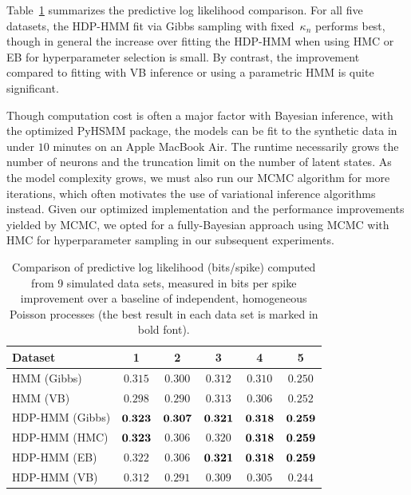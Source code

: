 Table~\ref{tab:synth_pll} summarizes the predictive log likelihood
comparison.  For all five datasets, the HDP-HMM fit via Gibbs sampling
with fixed~$\kappa_n$ performs best, though in general the increase
over fitting the HDP-HMM when using HMC or EB for hyperparameter
selection is small. By contrast, the improvement compared to fitting
with VB inference or using a parametric HMM is quite significant.

Though computation cost is often a major factor with Bayesian
inference, with the optimized PyHSMM package, the models can be fit to
the synthetic data in under $10$ minutes on an Apple MacBook Air. The
runtime necessarily grows the number of neurons and the truncation
limit on the number of latent states. As the model complexity grows,
we must also run our MCMC algorithm for more iterations, which often
motivates the use of variational inference algorithms instead. Given
our optimized implementation and the performance improvements yielded
by MCMC, we opted for a fully-Bayesian approach using MCMC with HMC
for hyperparameter sampling in our subsequent experiments.

\begin{table}
  \centering
  \caption[Comparison of predictive log likelihood on synthetic
    data]{Comparison of predictive log likelihood (bits/spike)
    computed from 9 simulated data sets, measured in bits per spike
    improvement over a baseline of independent, homogeneous Poisson
    processes (the best result in each data set is marked in bold
    font). }
  \begin{tabular}{l|ccccc}
    Dataset & 1 & 2 & 3 & 4 & 5 \\
    \hline
    HMM (Gibbs)     & $0.315$      & $0.300$ & $0.312$ & $0.310$ & $0.250$ \\
    HMM (VB)        & $0.298$      & $0.290$ & $0.313$ & $0.306$ & $0.252$ \\ 
    HDP-HMM (Gibbs) & $\bf{0.323}$ & $\bf{0.307}$ & $\bf{0.321}$ & $\bf{0.318}$ & $\bf{0.259}$ \\
    HDP-HMM (HMC)   & $\bf{0.323}$ & $0.306$ & $0.320$ & $\bf{0.318}$ & $\bf{0.259}$ \\
    HDP-HMM (EB)    & $0.322$      & $0.306$ & $\bf{0.321}$ & $\bf{0.318}$ & $\bf{0.259}$ \\
    HDP-HMM (VB)    & $0.312$      & $0.291$ & $0.309$ & $0.305$ & $0.244$ \\
    \hline
  \end{tabular}
  \label{tab:synth_pll}
\end{table}

